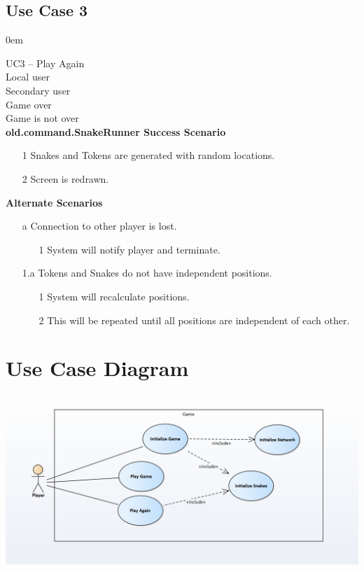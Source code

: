 \documentclass[titlepage]{article}
\begin{document}
	\subsection{Use Case 3}
	\itemsep0em 
	
	\textbf{} UC3 -- Play Again\\
	\textbf{} Local user\\
	\textbf{} Secondary user\\
	\textbf{} Game over\\
	\textbf{} Game is not over\\
	\textbf{old.command.SnakeRunner Success Scenario}
	\begin{enumerate}
		\itemsep0em 
		\item[1] Snakes and Tokens are generated with random locations.
		\item[2] Screen is redrawn.
	\end{enumerate}
	\textbf{Alternate Scenarios}
	\begin{enumerate}
		\itemsep0em 
		\item[a]Connection to other player is lost.
		\begin{enumerate}
			\itemsep0em 
			\item[1]System will notify player and terminate.
		\end{enumerate}
	\item[1.a]Tokens and Snakes do not have independent positions.
			\begin{enumerate}
		\itemsep0em 
		\item[1]System will recalculate positions.
		\item[2]This will be repeated until all positions are independent of each other.
	\end{enumerate}
		
	\end{enumerate}
	
	\section{Use Case Diagram}
	\includegraphics[scale=.75]{UCD}
	
\end{document}
